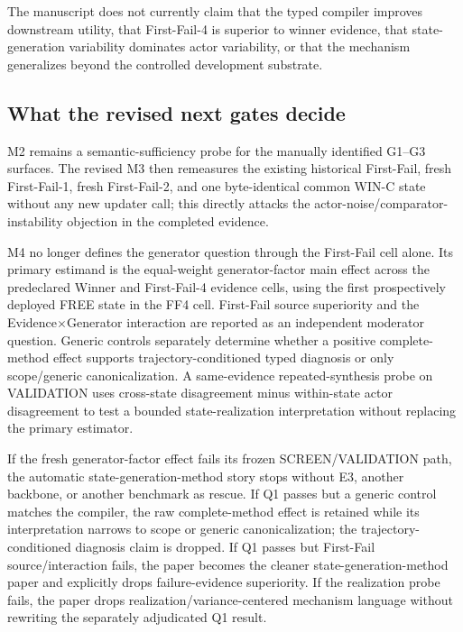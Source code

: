 The manuscript does not currently claim that the typed compiler improves downstream utility, that First-Fail-4 is superior to winner evidence, that state-generation variability dominates actor variability, or that the mechanism generalizes beyond the controlled development substrate.

\subsection{What the revised next gates decide}
M2 remains a semantic-sufficiency probe for the manually identified G1--G3 surfaces. The revised M3 then remeasures the existing historical First-Fail, fresh First-Fail-1, fresh First-Fail-2, and one byte-identical common WIN-C state without any new updater call; this directly attacks the actor-noise/comparator-instability objection in the completed evidence.

M4 no longer defines the generator question through the First-Fail cell alone. Its primary estimand is the equal-weight generator-factor main effect across the predeclared Winner and First-Fail-4 evidence cells, using the first prospectively deployed FREE state in the FF4 cell. First-Fail source superiority and the Evidence$\times$Generator interaction are reported as an independent moderator question. Generic controls separately determine whether a positive complete-method effect supports trajectory-conditioned typed diagnosis or only scope/generic canonicalization. A same-evidence repeated-synthesis probe on VALIDATION uses cross-state disagreement minus within-state actor disagreement to test a bounded state-realization interpretation without replacing the primary estimator.

If the fresh generator-factor effect fails its frozen SCREEN/VALIDATION path, the automatic state-generation-method story stops without E3, another backbone, or another benchmark as rescue. If Q1 passes but a generic control matches the compiler, the raw complete-method effect is retained while its interpretation narrows to scope or generic canonicalization; the trajectory-conditioned diagnosis claim is dropped. If Q1 passes but First-Fail source/interaction fails, the paper becomes the cleaner state-generation-method paper and explicitly drops failure-evidence superiority. If the realization probe fails, the paper drops realization/variance-centered mechanism language without rewriting the separately adjudicated Q1 result.
